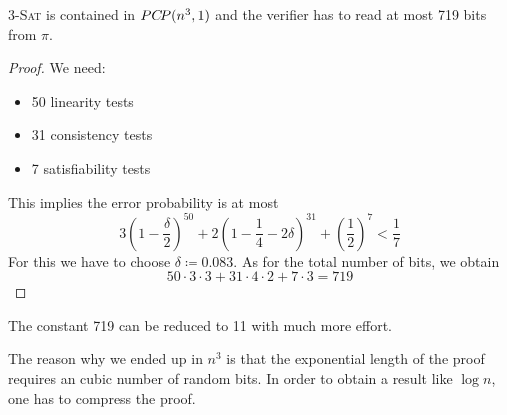 \documentclass[../skript.tex]{subfiles}
\begin{document}
\begin{theorem} %
\textsc{3-Sat} is contained in $PC \! P(n^3, 1)$ and the verifier has to read at most 719 bits from $\pi$.
\end{theorem}
\begin{proof}
We need:
\begin{itemize}
\item 50 linearity tests
\item 31 consistency tests
\item 7 satisfiability tests
\end{itemize}
This implies the error probability is at most
\[
	3 \left( 1 - \frac{\delta}{2} \right)^{50} + 2 \left( 1 - \frac{1}{4} - 2 \delta \right)^{31} + \left( \frac{1}{2} \right)^7 < \frac{1}{7}
\]
For this we have to choose $\delta \coloneqq 0.083$.
As for the total number of bits, we obtain
\[
	50 \cdot 3 \cdot 3 + 31 \cdot 4 \cdot 2 + 7 \cdot 3 = 719
\]
\end{proof}
\begin{remark}
The constant 719 can be reduced to 11 with much more effort.
\end{remark}
The reason why we ended up in $n^3$ is that the exponential length of the proof requires an cubic number of random bits. In order to obtain a result like $\log n$, one has to compress the proof.
\end{document}
